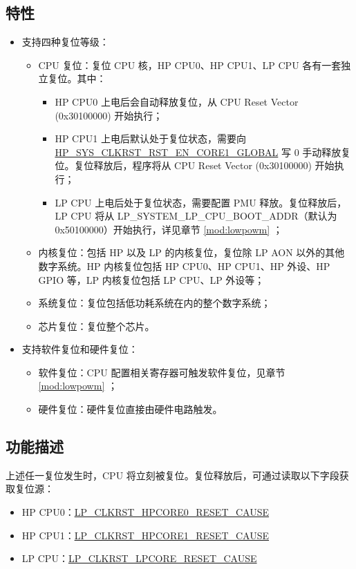 \documentclass[main\_\_CN.tex]{subfiles}
\begin{document}
\subsection{特性}
\label{sec:resclk-features}
\begin{itemize}
    \item 支持四种复位等级：
    \begin{itemize}
        \item CPU 复位：复位 CPU 核，HP CPU0、HP CPU1、LP CPU 各有一套独立复位。其中：
        \begin{itemize}
            \item HP CPU0 上电后会自动释放复位，从 CPU Reset Vector (0x30100000) 开始执行；
            \item HP CPU1 上电后默认处于复位状态，需要向 \hyperref[fielddesc:HPSYSCLKRSTRSTENCORE1GLOBAL]{HP\_SYS\_CLKRST\_RST\_EN\_CORE1\_GLOBAL} 写 0 手动释放复位。复位释放后，程序将从 CPU Reset Vector (0x30100000) 开始执行；
            \item LP CPU 上电后处于复位状态，需要配置 PMU 释放。复位释放后，LP CPU 将从 LP\_SYSTEM\_LP\_CPU\_BOOT\_ADDR（默认为 0x50100000）开始执行，详见章节 \ref{mod:lowpowm} \textit{}；
        \end{itemize}
        \item 内核复位：包括 HP 以及 LP 的内核复位，复位除 LP AON 以外的其他数字系统。HP 内核复位包括 HP CPU0、HP CPU1、HP 外设、HP GPIO 等，LP 内核复位包括 LP CPU、LP 外设等；
        \item 系统复位：复位包括低功耗系统在内的整个数字系统；
        \item 芯片复位：复位整个芯片。
    \end{itemize}
    \item 支持软件复位和硬件复位：
    \begin{itemize}
        \item 软件复位：CPU 配置相关寄存器可触发软件复位，见章节 \ref{mod:lowpowm} \textit{}；
        \item 硬件复位：硬件复位直接由硬件电路触发。
    \end{itemize}
\end{itemize}

\subsection{功能描述}
上述任一复位发生时，CPU 将立刻被复位。复位释放后，可通过读取以下字段获取复位源：
\begin{itemize}
    \item HP CPU0：\hyperref[fielddesc:LPCLKRSTHPCORE0RESETCAUSE]{LP\_CLKRST\_HPCORE0\_RESET\_CAUSE}
    \item HP CPU1：\hyperref[fielddesc:LPCLKRSTHPCORE0RESETCAUSE]{LP\_CLKRST\_HPCORE1\_RESET\_CAUSE}
    \item LP CPU：\hyperref[fielddesc:LPCLKRSTLPCORERESETCAUSE]{LP\_CLKRST\_LPCORE\_RESET\_CAUSE}
\end{itemize}
\end{document}
